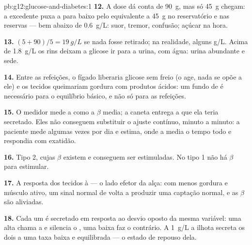 \begin{solution}{pb:g12:glucose-and-diabetes:1}
\textbf{12.} A dose dá conta de \qty{90}{g}, mas só \qty{45}{g} chegam:
a  excedente puxa a  para baixo pelo equivalente a
\qty{45}{g} no reservatório e nas reservas --- bem abaixo de
\qty{0.6}{g/L}: suor, tremor, confusão; açúcar na hora.

\textbf{13.} $(5 + 90)/5 = \qty{19}{g/L}$ se nada fosse retirado; na
realidade, alguns \unit{g/L}. Acima de \qty{1.8}{g/L} os rins deixam a
glicose ir para a urina, com água: urina abundante e sede.

\textbf{14.} Entre as refeições, o fígado liberaria glicose sem freio
(o  age, nada se opõe a ele) e os tecidos queimariam gordura
com produtos ácidos: um fundo de  é necessário para o
equilíbrio básico, e não só para as refeições.

\textbf{15.} O medidor mede a  como a  $\beta$ media; a
caneta entrega a  que ela teria secretado. Eles não conseguem
substituir o ajuste contínuo, minuto a minuto: a paciente mede algumas
vezes por dia e estima, onde a  media o tempo todo e respondia
com exatidão.

\textbf{16.} Tipo 2, cujas  $\beta$ existem e conseguem ser
estimuladas. No tipo 1 não há  $\beta$ para estimular.

\textbf{17.} A resposta dos tecidos à  --- o lado efetor da
alça: com menos gordura e músculo ativo, um sinal normal de 
volta a produzir uma captação normal, e as  $\beta$ são aliviadas.

\textbf{18.} Cada um é secretado em resposta ao desvio oposto da mesma
variável: uma  alta chama a  e silencia o , uma
baixa faz o contrário. A \qty{1}{g/L} a ilhota secreta os dois a uma
taxa baixa e equilibrada --- o estado de repouso dela.


\end{solution}
